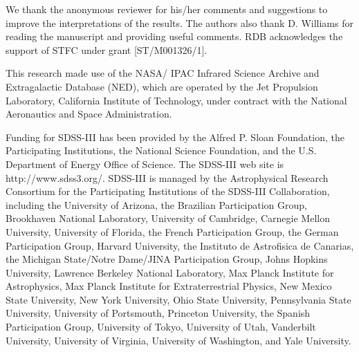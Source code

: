 \documentclass[traditabstract]{aa}
\begin{document}
 
 

\begin{acknowledgements}
  We thank the anonymous reviewer for his/her comments and suggestions
  to improve the interpretations of the results. The authors also thank
  D. Williams for reading the manuscript and providing useful
  comments.  RDB acknowledges the support of STFC under grant
  [ST/M001326/1].

This research made use of the NASA/ IPAC Infrared Science Archive and
Extragalactic Database (NED), which are operated by the Jet Propulsion
Laboratory, California Institute of Technology, under contract with the
National Aeronautics and Space Administration.

Funding for SDSS-III has been provided by the Alfred P. Sloan Foundation, the
Participating Institutions, the National Science Foundation, and the
U.S. Department of Energy Office of Science. The SDSS-III web site is
http://www.sdss3.org/.  SDSS-III is managed by the Astrophysical Research
Consortium for the Participating Institutions of the SDSS-III Collaboration,
including the University of Arizona, the Brazilian Participation Group,
Brookhaven National Laboratory, University of Cambridge, Carnegie Mellon
University, University of Florida, the French Participation Group, the German
Participation Group, Harvard University, the Instituto de Astrofisica de
Canarias, the Michigan State/Notre Dame/JINA Participation Group, Johns
Hopkins University, Lawrence Berkeley National Laboratory, Max Planck
Institute for Astrophysics, Max Planck Institute for Extraterrestrial Physics,
New Mexico State University, New York University, Ohio State University,
Pennsylvania State University, University of Portsmouth, Princeton University,
the Spanish Participation Group, University of Tokyo, University of Utah,
Vanderbilt University, University of Virginia, University of Washington, and
Yale University.

\end{acknowledgements}


\end{document}
